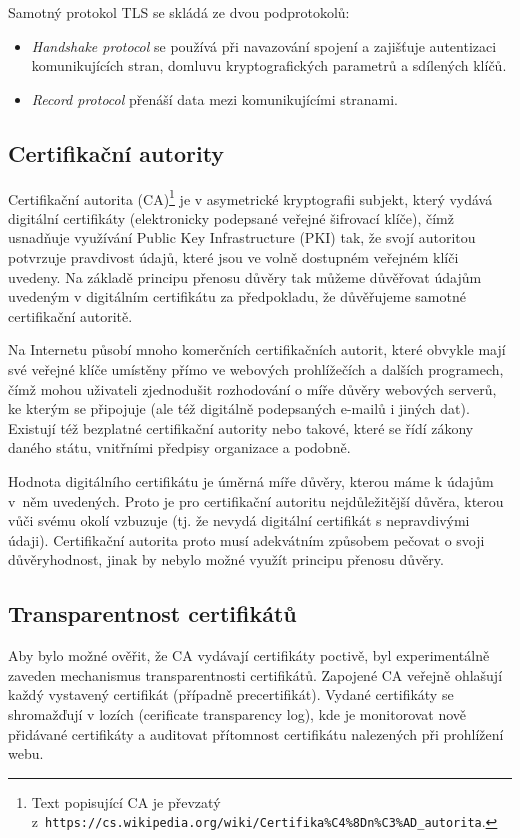 Samotný protokol TLS se skládá ze dvou podprotokolů:

\begin{itemize}

  \item \emph{Handshake protocol} se používá při navazování spojení a zajišťuje
  autentizaci komunikujících stran, domluvu kryptografických parametrů a
  sdílených klíčů.

  \item \emph{Record protocol} přenáší data mezi komunikujícími stranami.

\end{itemize}

\subsection{Certifikační autority}


Certifikační autorita (CA)\footnote{Text popisující CA je převzatý z~{\tt https://cs.wikipedia.org/wiki/Certifika\%C4\%8Dn\%C3\%AD\_autorita}.} je v asymetrické kryptografii subjekt, který vydává
digitální certifikáty (elektronicky podepsané veřejné šifrovací klíče), čímž
usnadňuje využívání Public Key Infrastructure (PKI) tak, že svojí autoritou
potvrzuje pravdivost údajů, které jsou ve volně dostupném veřejném klíči
uvedeny. Na základě principu přenosu důvěry tak můžeme důvěřovat
údajům uvedeným v digitálním certifikátu za předpokladu, že důvěřujeme samotné
certifikační autoritě.

Na Internetu působí mnoho komerčních certifikačních autorit, které obvykle mají
své veřejné klíče umístěny přímo ve webových prohlížečích a dalších programech,
čímž mohou uživateli zjednodušit rozhodování o míře důvěry webových serverů, ke
kterým se připojuje (ale též digitálně podepsaných e-mailů i jiných dat).
Existují též bezplatné certifikační autority nebo takové, které se řídí zákony
daného státu, vnitřními předpisy organizace a podobně.

Hodnota digitálního certifikátu je úměrná míře důvěry, kterou máme k údajům
v~něm uvedených. Proto je pro certifikační autoritu nejdůležitější důvěra, kterou
vůči svému okolí vzbuzuje (tj. že nevydá digitální certifikát s nepravdivými
údaji). Certifikační autorita proto musí adekvátním způsobem pečovat o svoji
důvěryhodnost, jinak by nebylo možné využít principu přenosu důvěry.

\subsection{Transparentnost certifikátů}

Aby bylo možné ověřit, že CA vydávají certifikáty poctivě, byl experimentálně
zaveden mechanismus transparentnosti certifikátů. Zapojené CA veřejně ohlašují
každý vystavený certifikát (případně precertifikát). Vydané certifikáty se
shromažďují v lozích (cerificate transparency log), kde je monitorovat nově
přidávané certifikáty a auditovat přítomnost certifikátu nalezených při
prohlížení webu.
